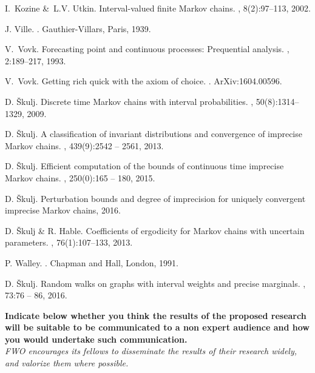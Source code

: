 \documentclass[11pt,dvipsnames,usenames,a4paper]{article}
\begin{document}
\begin{thebibliography}{10}
I.~Kozine \&~L.V. Utkin.
\newblock Interval-valued finite {M}arkov chains.
, 8(2):97--113, 2002.

J. Ville.
.
\newblock Gauthier-Villars, Paris, 1939.

V.~Vovk.
\newblock Forecasting point and continuous processes: Prequential analysis.
, 2:189--217, 1993.

V.~Vovk.
\newblock Getting rich quick with the axiom of choice.
.
\newblock ArXiv:1604.00596.

D. \v{S}kulj.
\newblock Discrete time {M}arkov chains with interval probabilities.
,
  50(8):1314--1329, 2009.

D. \v{S}kulj.
\newblock A classification of invariant distributions and convergence of
  imprecise {M}arkov chains.
, 439(9):2542 -- 2561, 2013.

D. \v{S}kulj.
\newblock Efficient computation of the bounds of continuous time imprecise
  {M}arkov chains.
, 250(0):165 -- 180, 2015.

D. \v{S}kulj.
\newblock Perturbation bounds and degree of imprecision for uniquely convergent
  imprecise {M}arkov chains, 2016.

D. \v{S}kulj \& R. Hable.
\newblock Coefficients of ergodicity for {M}arkov chains with uncertain
  parameters.
, 76(1):107--133, 2013.

P. Walley.
.
\newblock Chapman and Hall, London, 1991.

D. Škulj.
\newblock Random walks on graphs with interval weights and precise marginals.
, 73:76 -- 86,
  2016.

\end{thebibliography}

\vspace{5mm}

\textbf{Indicate below whether you think the results of the proposed research will be suitable to be communicated to a non expert audience and how you would undertake such communication.}\\
\textit{FWO encourages its fellows to disseminate the results of their research widely, and valorize them where possible.}
\end{document}
